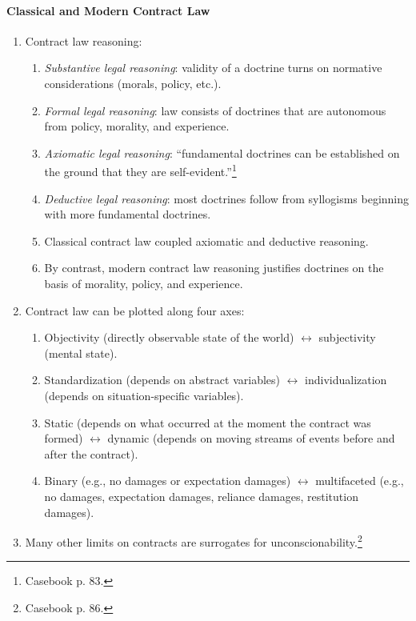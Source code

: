 \paragraph{Classical and Modern Contract Law}

\begin{enumerate}
    \item Contract law reasoning:
    \begin{enumerate}
        \item \emph{Substantive legal reasoning}: validity of a doctrine turns 
        on normative considerations (morals, policy, etc.).
        \item \emph{Formal legal reasoning}: law consists of doctrines that 
        are autonomous from policy, morality, and experience.
        \item \emph{Axiomatic legal reasoning}: ``fundamental doctrines can be 
        established on the ground that they are 
        self-evident.''\footnote{Casebook p. 83.}
        \item \emph{Deductive legal reasoning}: most doctrines follow from 
        syllogisms beginning with more fundamental doctrines.
        \item Classical contract law coupled axiomatic and deductive 
        reasoning.
        \item By contrast, modern contract law reasoning justifies doctrines 
        on the basis of morality, policy, and experience.
    \end{enumerate}
    \item Contract law can be plotted along four axes:
    \begin{enumerate}
        \item Objectivity (directly observable state of the world) 
        $\leftrightarrow$ subjectivity (mental state).
        \item Standardization (depends on abstract variables) $\leftrightarrow$ 
        individualization (depends on situation-specific variables).
        \item Static (depends on what occurred at the moment the contract was 
        formed) $\leftrightarrow$ dynamic (depends on moving streams of events 
        before and after the contract).
        \item Binary (e.g., no damages or expectation damages) 
        $\leftrightarrow$ multifaceted (e.g., no damages, expectation damages, 
        reliance damages, restitution damages).
    \end{enumerate}
    \item Many other limits on contracts are surrogates for 
    unconscionability.\footnote{Casebook p. 86.}
\end{enumerate}

